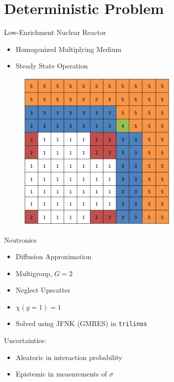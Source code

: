 \documentclass{beamer}
\begin{document}
\section{Deterministic Problem}
\begin{frame}{Low-Enrichment Nuclear Reactor}
\begin{itemize}
\item Homogenized Multiplying Medium
\item Steady State Operation
\end{itemize}
\begin{figure}
  \includegraphics[width=0.5\linewidth]{../graphics/core}
\end{figure}
\end{frame}

\begin{frame}{Neutronics}
\begin{itemize}\vspace{-20pt}
\item Diffusion Approximation
\item Multigroup, $G=2$
\item Neglect Upscatter
\item $\chi(g=1)=1$
\item Solved using JFNK (GMRES) in \texttt{trilinos}
\end{itemize}\vspace{10pt}
Uncertainties:
\begin{itemize}
\item Aleatoric in interaction probability
\item Epistemic in measurements of $\sigma$
\end{itemize}
\end{frame}
\end{document}
